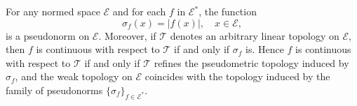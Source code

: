 For any normed space $\mathcal{E}$ and for each $f$ in $\mathcal{E}^*$, the function
$$\sigma_f(x) = |f(x)|, \quad x \in \mathcal{E},$$
is a pseudonorm on $\mathcal{E}$. Moreover, if $\mathcal{T}$ denotes an arbitrary linear topology on $\mathcal{E}$, then $f$ is continuous with respect to $\mathcal{T}$ if and only if $\sigma_f$ is. Hence $f$ is continuous with respect to $\mathcal{T}$ if and only if $\mathcal{T}$ refines the pseudometric topology induced by $\sigma_f$, and the weak topology on $\mathcal{E}$ coincides with the topology induced by the family of pseudonorms $\{\sigma_f\}_{f \in \mathcal{E}^*}$.
